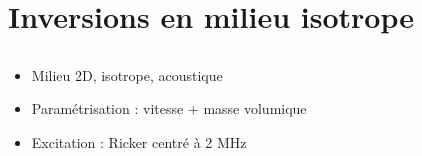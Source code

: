 \documentclass[10pt,xcolor=x11names,compress, notes=show]{beamer}%
\begin{document}
\section{Inversions en milieu isotrope}
\subsection*{}
\begin{frame}{\insertsectionhead}
	\begin{itemize}
		\item<1-> Milieu 2D, isotrope, acoustique
		\item<1-> Paramétrisation : vitesse + masse volumique
		\item<2-> Excitation : Ricker centré à 2 MHz 
	\end{itemize}	
	

\end{frame}
\end{document}
